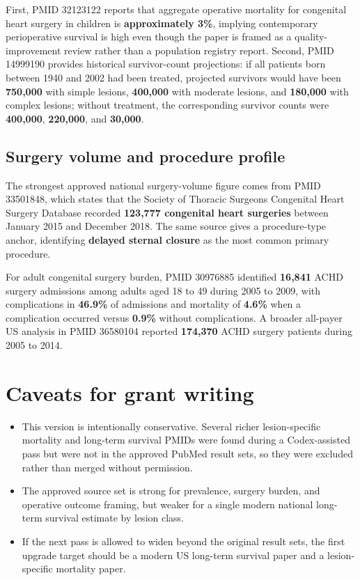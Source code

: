 \documentclass[11pt]{article}
\begin{document}
First, PMID 32123122 reports that aggregate operative mortality for congenital heart surgery in children is \textbf{approximately 3\%}, implying contemporary perioperative survival is high even though the paper is framed as a quality-improvement review rather than a population registry report. Second, PMID 14999190 provides historical survivor-count projections: if all patients born between 1940 and 2002 had been treated, projected survivors would have been \textbf{750,000} with simple lesions, \textbf{400,000} with moderate lesions, and \textbf{180,000} with complex lesions; without treatment, the corresponding survivor counts were \textbf{400,000}, \textbf{220,000}, and \textbf{30,000}.

\subsection{Surgery volume and procedure profile}
The strongest approved national surgery-volume figure comes from PMID 33501848, which states that the Society of Thoracic Surgeons Congenital Heart Surgery Database recorded \textbf{123,777 congenital heart surgeries} between January 2015 and December 2018. The same source gives a procedure-type anchor, identifying \textbf{delayed sternal closure} as the most common primary procedure.

For adult congenital surgery burden, PMID 30976885 identified \textbf{16,841} ACHD surgery admissions among adults aged 18 to 49 during 2005 to 2009, with complications in \textbf{46.9\%} of admissions and mortality of \textbf{4.6\%} when a complication occurred versus \textbf{0.9\%} without complications. A broader all-payer US analysis in PMID 36580104 reported \textbf{174,370} ACHD surgery patients during 2005 to 2014.

\section{Caveats for grant writing}
\begin{itemize}[leftmargin=1.5em]
  \item This version is intentionally conservative. Several richer lesion-specific mortality and long-term survival PMIDs were found during a Codex-assisted pass but were not in the approved PubMed result sets, so they were excluded rather than merged without permission.
  \item The approved source set is strong for prevalence, surgery burden, and operative outcome framing, but weaker for a single modern national long-term survival estimate by lesion class.
  \item If the next pass is allowed to widen beyond the original result sets, the first upgrade target should be a modern US long-term survival paper and a lesion-specific mortality paper.
\end{itemize}
\end{document}
